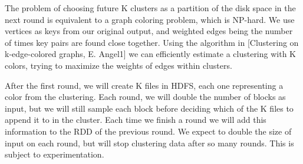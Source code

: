 \documentclass[12pt]{extarticle}
\begin{document}
The problem of choosing future K clusters as a partition of the disk space in the next round is equivalent to a graph coloring problem, which is NP-hard.  We use vertices as keys from our original output, and weighted edges being the number of times key pairs are found close together.  Using the algorithm in [Clustering on k-edge-colored graphs, E. Angel1] we can efficiently estimate a clustering with K colors, trying to maximize the weights of edges within clusters.

After the first round, we will create K files in HDFS, each one representing a color from the clustering. Each round, we will double the number of blocks as input, but we will still sample each block before deciding which of the K files to append it to in the cluster.  Each time we finish a round we will add this information to the 
RDD of the previous round.  We expect to double the size of input on each round, but will stop clustering data after so many rounds.  This is subject to experimentation.  


\begin{comment}
currently, web crawling agents 
that create MapReduce inputu
have no intelligent hdfs placement which 
creates a lot of overhead in the shuffle
phase.



We want to place data into hdfs by predicting 
its likely partition in the reduction
phase.
\end{comment}
\end{document}
